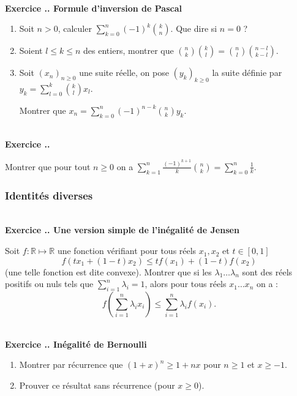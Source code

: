 \documentclass{article}
\newcommand{\mb}[1]{\mathbb{#1}}
\newcounter{exo}
\newcommand{\exercice}[1][\null]{\textbf{\\ Exercice \thesection.\theexo. #1} \addtocounter{exo}{1}}
\begin{document}
\exercice[Formule d'inversion de Pascal]

\begin{enumerate}

\item Soit $n > 0$, calculer $\displaystyle \sum_{k=0}^n (-1)^k {k \choose n}$. Que dire si $n = 0$ ?

\item Soient $l \le k \le n$ des entiers, montrer que $\displaystyle {n \choose k} {k \choose l} = {n \choose l} {n-l \choose k-l} $.

\item Soit $(x_n)_{n \ge 0}$ une suite réelle, on pose $(y_k)_{k \ge 0}$ la suite définie par $\displaystyle y_k = \sum_{l=0}^k {k \choose l} x_l$.

Montrer que $\displaystyle x_n = \sum_{k=0}^n (-1)^{n-k} {n \choose k} y_k$.

\end{enumerate}


\exercice

Montrer que pour tout $n \ge 0$ on a $\displaystyle \sum_{k=1}^n \frac{(-1)^{k+1}}{k} {n \choose k} = \sum_{k=0}^n \frac{1}{k}$.



\subsubsection{Identités diverses}






\exercice[Une version simple de l'inégalité de Jensen]

Soit $f: \mb{R} \mapsto \mb{R}$ une fonction vérifiant pour tous réels $x_1, x_2$ et $t \in [0,1]$
$$f(t x_1 +(1-t) x_2) \le t f(x_1) +(1-t) f(x_2)$$  (une telle fonction est dite convexe).
Montrer que si les $\lambda_1 \dots \lambda_n$ sont des réels positifs ou nuls tels que $\sum_{i=1}^n \lambda_i = 1$, alors pour tous réels $x_1 \dots x_n$ on a :
$$f\left(\sum_{i=1}^n \lambda_i x_i\right) \le \sum_{i=1}^n \lambda_i f(x_i).$$


\exercice[Inégalité de Bernoulli]

\begin{enumerate}

\item Montrer par récurrence que $(1+x)^n \ge 1+nx$ pour $n \ge 1$ et $x \ge -1$.

\item Prouver ce résultat sans récurrence (pour $x \ge 0$).

\end{enumerate}
\end{document}
